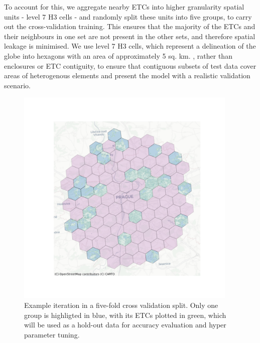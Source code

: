 \documentclass[
  letterpaper,
  DIV=11,
  numbers=noendperiod]{scrartcl}
\begin{document}
To account for this, we aggregate nearby ETCs into higher granularity
spatial units - level 7 H3 cells - and randomly split these units into
five groups, to carry out the cross-validation training. This ensures
that the majority of the ETCs and their neighbours in one set are not
present in the other sets, and therefore spatial leakage is minimised.
We use level 7 H3 cells, which represent a delineation of the globe into
hexagons with an area of approximately 5 sq. km. , rather than
enclosures or ETC contiguity, to ensure that contiguous subsets of test
data cover areas of heterogenous elements and present the model with a
realistic validation scenario.

\begin{figure}[H]

{\centering \includegraphics[width=\linewidth,height=4.16667in,keepaspectratio]{../figures/algo_design/train_test_prague.png}

}

\caption{Example iteration in a five-fold cross validation split. Only
one group is highligted in blue, with its ETCs plotted in green, which
will be used as a hold-out data for accuracy evaluation and hyper
parameter tuning.}

\end{figure}%
\end{document}
